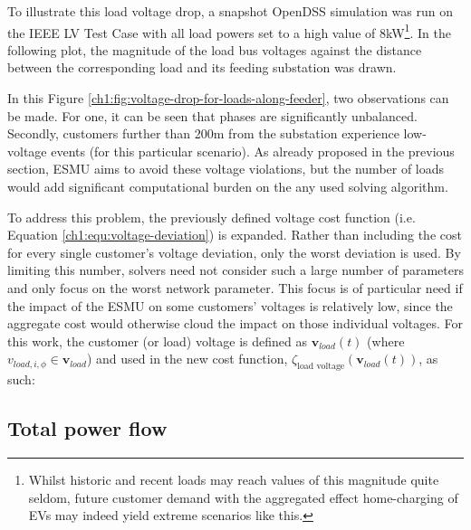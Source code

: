 To illustrate this load voltage drop, a snapshot OpenDSS simulation was run on the IEEE LV Test Case with all load powers set to a high value of 8kW\footnote[1]{Whilst historic and recent loads may reach values of this magnitude quite seldom, future customer demand with the aggregated effect home-charging of EVs may indeed yield extreme scenarios like this.}.
In the following plot, the magnitude of the load bus voltages against the distance between the corresponding load and its feeding substation was drawn.




In this Figure \ref{ch1:fig:voltage-drop-for-loads-along-feeder}, two observations can be made.
For one, it can be seen that phases are significantly unbalanced.
Secondly, customers further than 200m from the substation experience low-voltage events (for this particular scenario).
As already proposed in the previous section, ESMU aims to avoid these voltage violations, but the number of loads would add significant computational burden on the any used solving algorithm.

To address this problem, the previously defined voltage cost function (i.e. Equation \ref{ch1:equ:voltage-deviation}) is expanded.
Rather than including the cost for every single customer's voltage deviation, only the worst deviation is used.
By limiting this number, solvers need not consider such a large number of parameters and only focus on the worst network parameter.
This focus is of particular need if the impact of the ESMU on some customers' voltages is relatively low, since the aggregate cost would otherwise cloud the impact on those individual voltages.
For this work, the customer (or load) voltage is defined as $\textbf{v}_{load}(t)$ (where $v_{load,i,\phi} \in \textbf{v}_{load}$) and used in the new cost function, $\zeta_\text{load voltage}(\textbf{v}_{load}(t))$, as such:



\subsection{Total power flow}
\label{ch1:subsec:total-power-flow}

